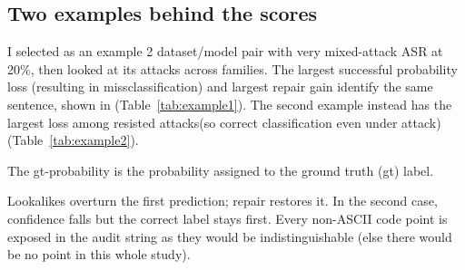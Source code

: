 \subsection{Two examples behind the scores}
I selected as an example 2 dataset/model pair with very mixed-attack ASR at 20\%, then looked at its attacks across families. The largest successful probability loss (resulting in missclassification) and largest repair gain identify the same sentence, shown in (Table~\ref{tab:example1}). The second example instead has the largest loss among resisted attacks(so correct classification even under attack) (Table~\ref{tab:example2}).

The gt-probability is the probability assigned to the ground truth (gt) label.



Lookalikes overturn the first prediction; repair restores it. In the second case, confidence falls but the correct label stays first. Every non-ASCII code point is exposed in the audit string as they would be indistinguishable (else there would be no point in this whole study).
